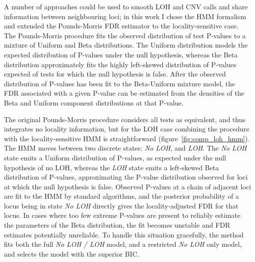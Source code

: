 \documentclass[thesis.tex]{subfiles}
\begin{document}
A number of approaches could be used to smooth LOH and CNV calls and share information between neighbouring loci; in this work I chose the \gls{HMM} formalism and extended the Pounds-Morris FDR estimator\cite{Pounds2003} to the locality-sensitive case.  The Pounds-Morris procedure fits the observed distribution of test P-values to a mixture of Uniform and Beta distributions.  The Uniform distribution models the expected distribution of P-values under the null hypothesis, whereas the Beta distribution approximately fits the highly left-skewed distribution of P-values expected of tests for which the null hypothesis is false.  After the observed distribution of P-values has been fit to the Beta-Uniform mixture model, the \gls{FDR} associated with a given P-value can be estimated from the densities of the Beta and Uniform component distributions at that P-value.

The original Pounds-Morris procedure considers all tests as equivalent, and thus integrates no locality information, but for the \gls{LOH} case combining the procedure with the locality-sensitive \gls{HMM} is straightforward (figure~\ref{fig:comp_loh_hmm}).  The \gls{HMM} moves between two discrete states: \emph{No LOH}, and \emph{LOH}.  The \emph{No LOH} state emits a Uniform distribution of P-values, as expected under the null hypothesis of no \gls{LOH}, whereas the \emph{LOH} state emits a left-skewed Beta distribution of P-values, approximating the P-value distribution observed for loci at which the null hypothesis is false.  Observed P-values at a chain of adjacent loci are fit to the \gls{HMM} by standard algorithms, and the posterior probability of a locus being in state \emph{No LOH} directly gives the locality-adjusted \gls{FDR} for that locus.  In cases where too few extreme P-values are present to reliably estimate the parameters of the Beta distribution, the fit becomes unstable and \gls{FDR} estimates potentially unreliable.  To handle this situation gracefully, the method fits both the full \emph{No LOH / LOH} model, and a restricted \emph{No LOH} only model, and selects the model with the superior \gls{BIC}.
\end{document}
